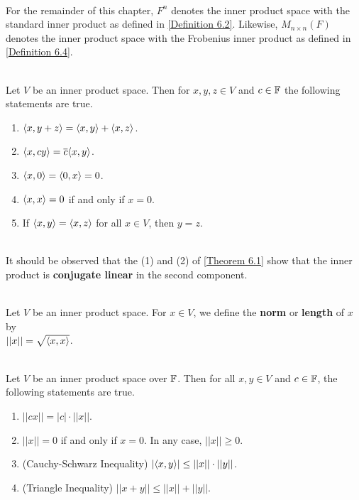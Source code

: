 \begin{notation}
	\hfill\\
	For the remainder of this chapter, $F^n$ denotes the inner product space with the standard inner product as defined in \autoref{Definition 6.2}. Likewise, $M_{n \times n}(F)$ denotes the inner product space with the Frobenius inner product as defined in \autoref{Definition 6.4}.
\end{notation}

\begin{theorem}\label{Theorem 6.1}
	\hfill\\
	Let $V$ be an inner product space. Then for $x,y,z \in V$ and $c \in \mathbb{F}$ the following statements are true.

	\begin{enumerate}
		\item $\langle x, y+z\rangle = \langle x,y\rangle + \langle x,z\rangle$.
		\item $\langle x,cy\rangle = \overline{c}\langle x,y\rangle$.
		\item $\langle x,0\rangle = \langle0,x\rangle = 0$.
		\item $\langle x,x\rangle = 0$ if and only if $x = 0$.
		\item If $\langle x,y\rangle = \langle x,z\rangle$ for all $x \in V$, then $y=z$.
	\end{enumerate}
\end{theorem}

\begin{remark}
	\hfill\\
	It should be observed that the (1) and (2) of \autoref{Theorem 6.1} show that the inner product is \textbf{conjugate linear} in the second component.
\end{remark}

\begin{definition}
	\hfill\\
	Let $V$ be an inner product space. For $x \in V$, we define the \textbf{norm} or \textbf{length} of $x$ by\\ $||x|| = \sqrt{\langle x,x\rangle}$.
\end{definition}

\begin{theorem}
	\hfill\\
	Let $V$ be an inner product space over $\mathbb{F}$. Then for all $x,y \in V$ and $c \in \mathbb{F}$, the following statements are true.

	\begin{enumerate}
		\item $||cx|| = |c|\cdot||x||$.
		\item $||x|| = 0$ if and only if $x = 0$. In any case, $||x|| \geq 0$.
		\item (Cauchy-Schwarz Inequality) $|\langle x,y\rangle| \leq ||x||\cdot||y||$.
		\item (Triangle Inequality) $||x + y|| \leq ||x|| + ||y||$.
	\end{enumerate}
\end{theorem}

